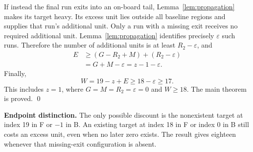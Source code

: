\documentclass{article}
\begin{document}
If instead the final run exits into an on-board tail, Lemma~\ref{lem:propagation} makes its
target heavy. Its excess unit lies outside all baseline regions and supplies that run's
additional unit. Only a run with a missing exit receives no required additional unit.
Lemma~\ref{lem:propagation} identifies precisely \(\varepsilon\) such runs. Therefore the number
of additional units is at least \(R_2 - \varepsilon\), and
\begin{equation}
  \begin{aligned}
    E &\ge (G - R_2 + M) + (R_2 - \varepsilon) \\
      &= G + M - \varepsilon = z - 1 - \varepsilon.
  \end{aligned}
\end{equation}
Finally,
\begin{equation}
  W = 19 - z + E \ge 18 - \varepsilon \ge 17.
\end{equation}
This includes \(z = 1\), where \(G = M = R_2 = \varepsilon = 0\) and \(W \ge 18\). The main
theorem is proved. \qed

\textbf{Endpoint distinction.} The only possible discount is the nonexistent target at index 19
in F or \(-1\) in B. An existing target at index 18 in F or index 0 in B still costs an excess
unit, even when no later zero exists. The result gives eighteen whenever that missing-exit
configuration is absent.
\end{document}
